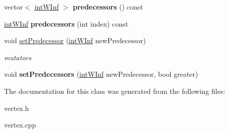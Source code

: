 \begin{DoxyCompactItemize}
\item 
\hypertarget{classvertex_a8428c7294b0d2a73a6b2d96ac70c7217}{
vector$<$ \hyperlink{classintWInf}{intWInf} $>$ {\bfseries predecessors} () const }
\label{classvertex_a8428c7294b0d2a73a6b2d96ac70c7217}

\item 
\hypertarget{classvertex_a605ac9c0f7bf2381685eb4273bfcfbd5}{
\hyperlink{classintWInf}{intWInf} {\bfseries predecessors} (int index) const }
\label{classvertex_a605ac9c0f7bf2381685eb4273bfcfbd5}

\item 
\hypertarget{classvertex_ad9fca368dda904209c33341c4dfcdfc6}{
void \hyperlink{classvertex_ad9fca368dda904209c33341c4dfcdfc6}{setPredecessor} (\hyperlink{classintWInf}{intWInf} newPredecessor)}
\label{classvertex_ad9fca368dda904209c33341c4dfcdfc6}

\begin{DoxyCompactList}\small\item\em mutators \end{DoxyCompactList}\item 
\hypertarget{classvertex_a2f06acc5e053d7076cd5421ee9d606a5}{
void {\bfseries setPredecessors} (\hyperlink{classintWInf}{intWInf} newPredecessor, bool greater)}
\label{classvertex_a2f06acc5e053d7076cd5421ee9d606a5}

\end{DoxyCompactItemize}


The documentation for this class was generated from the following files:\begin{DoxyCompactItemize}
\item 
vertex.h\item 
vertex.cpp\end{DoxyCompactItemize}
